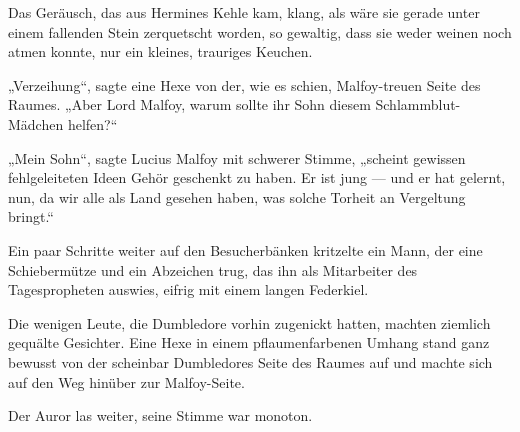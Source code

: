 Das Geräusch, das aus Hermines Kehle kam, klang, als wäre sie gerade unter einem fallenden Stein zerquetscht worden, so gewaltig, dass sie weder weinen noch atmen konnte, nur ein kleines, trauriges Keuchen.

„Verzeihung“, sagte eine Hexe von der, wie es schien, Malfoy-treuen Seite des Raumes.
„Aber Lord Malfoy, warum sollte ihr Sohn diesem Schlammblut-Mädchen helfen?“

„Mein Sohn“, sagte Lucius Malfoy mit schwerer Stimme, „scheint gewissen fehlgeleiteten Ideen Gehör geschenkt zu haben. Er ist jung — und er hat gelernt, nun, da wir alle als Land gesehen haben, was solche Torheit an Vergeltung bringt.“

Ein paar Schritte weiter auf den Besucherbänken kritzelte ein Mann, der eine Schiebermütze und ein Abzeichen trug, das ihn als Mitarbeiter des Tagespropheten auswies, eifrig mit einem langen Federkiel.

Die wenigen Leute, die Dumbledore vorhin zugenickt hatten, machten ziemlich gequälte Gesichter. Eine Hexe in einem pflaumenfarbenen Umhang stand ganz bewusst von der scheinbar Dumbledores Seite des Raumes auf und machte sich auf den Weg hinüber zur Malfoy-Seite.

Der Auror las weiter, seine Stimme war monoton.

